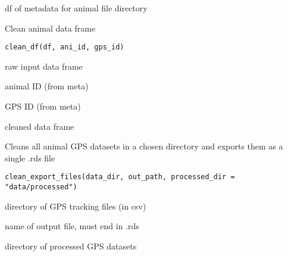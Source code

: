 \documentclass[a4paper]{book}
\begin{document}
%
\begin{Value}
df of metadata for animal file directory
\end{Value}
%
\begin{Description}\relax
Clean animal data frame
\end{Description}
%
\begin{Usage}
\begin{verbatim}
clean_df(df, ani_id, gps_id)
\end{verbatim}
\end{Usage}
%
\begin{Arguments}
\begin{ldescription}
\item[\code{df}] raw input data frame

\item[\code{ani\_id}] animal ID (from meta)

\item[\code{gps\_id}] GPS ID (from meta)
\end{ldescription}
\end{Arguments}
%
\begin{Value}
cleaned data frame
\end{Value}
%
\begin{Description}\relax
Cleans all animal GPS datasets in a chosen directory and exports them as a single .rds file
\end{Description}
%
\begin{Usage}
\begin{verbatim}
clean_export_files(data_dir, out_path, processed_dir = "data/processed")
\end{verbatim}
\end{Usage}
%
\begin{Arguments}
\begin{ldescription}
\item[\code{data\_dir}] directory of GPS tracking files (in csv)

\item[\code{out\_path}] name of output file, must end in .rds

\item[\code{processed\_dir}] directory of processed GPS datasets
\end{ldescription}
\end{Arguments}
\end{document}
